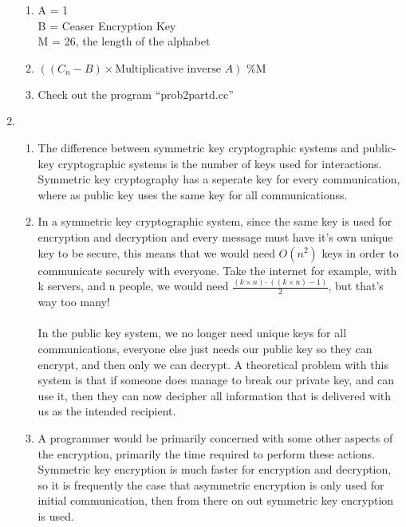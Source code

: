 \documentclass[a4paper, 11pt]{article}
\begin{document}
\begin{enumerate}
\begin{enumerate}
  \item
    A = 1 \\
    B = Ceaser Encryption Key \\
    M = 26, the length of the alphabet

  \item
    $ 
    (( C_n - B ) \times \mbox{Multiplicative inverse } A)
    \mbox{ \% M }
    $

  \item
    Check out the program ``prob2partd.cc''\\

  \end{enumerate}

\item
  \begin{enumerate}
    \item
      The difference between symmetric key cryptographic systems and
      public-key cryptographic systems is the number of keys used for
      interactions.  Symmetric key cryptography has a seperate key for
      every communication, where as public key uses the same key for
      all communicationss.

    \item
      In a symmetric key cryptographic system, since the same key is
      used for encryption and decryption and every message must have
      it's own unique key to be secure, this means that we would
      need $O(n^2)$ keys in order to communicate securely with
      everyone.  Take the internet for example, with k servers, and n
      people, we would need $\frac{ (k \times n)\cdot((k \times n) -
        1)}{2}$, but that's way too many! \\\\ In the public key
      system, we no longer need unique keys for all communications,
      everyone else just needs our public key so they can encrypt, and
      then only we can decrypt.  A theoretical problem with this
      system is that if someone does manage to break our private key,
      and can use it, then they can now decipher all information that
      is delivered with us as the intended recipient.

    \item
      A programmer would be primarily concerned with some other
      aspects of the encryption, primarily the time required to
      perform these actions.  Symmetric key encryption is much faster
      for encryption and decryption, so it is frequently the case that
      asymmetric encryption is only used for initial communication,
      then from there on out symmetric key encryption is used.


\end{enumerate}
\end{enumerate}
\end{document}
